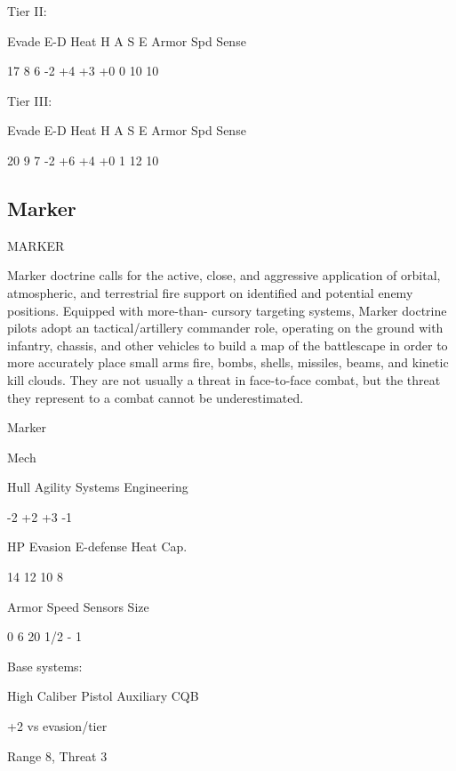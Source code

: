Tier II:
 

          Evade     E-D    Heat    H     A     S     E       Armor         Spd      Sense 

          17        8      6       -2    +4    +3    +0      0             10       10 

Tier III:
 

          Evade     E-D    Heat    H     A     S     E       Armor         Spd      Sense 

          20        9      7       -2    +6    +4    +0       1            12       10 

                                                                                                                  

\subsection{Marker}
                                                MARKER  

Marker doctrine calls for the active, close, and aggressive application of orbital, atmospheric, and  
terrestrial fire support on identified and potential enemy positions. Equipped with more-than- 
cursory targeting systems, Marker doctrine pilots adopt an tactical/artillery commander role,  
operating on the ground with infantry, chassis, and other vehicles to build a map of the  
battlescape in order to more accurately place small arms fire, bombs, shells, missiles, beams, and  
kinetic kill clouds. They are not usually a threat in face-to-face combat, but the threat they  
represent to a combat cannot be underestimated.   

       Marker 

       Mech 

       Hull       Agility     Systems       Engineering 

       -2         +2          +3            -1 

       HP         Evasion     E-defense     Heat Cap. 

       14         12          10            8 

       Armor      Speed       Sensors       Size 

       0          6           20            1/2 - 1 

Base systems:
 
High Caliber Pistol  
Auxiliary CQB
 
+2 vs evasion/tier
 
Range 8, Threat 3
 
